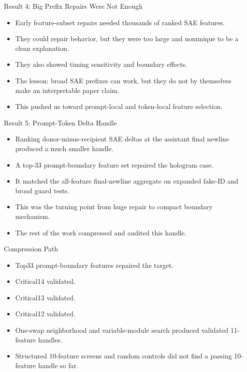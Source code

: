 \documentclass[aspectratio=169]{beamer}
\begin{document}
\begin{frame}{Result 4: Big Prefix Repairs Were Not Enough}
\small
\begin{itemize}
  \item Early feature-subset repairs needed thousands of ranked SAE features.
  \item They could repair behavior, but they were too large and nonunique to be a clean explanation.
  \item They also showed timing sensitivity and boundary effects.
  \item The lesson: broad SAE prefixes can work, but they do not by themselves make an interpretable paper claim.
  \item This pushed us toward prompt-local and token-local feature selection.
\end{itemize}
\end{frame}

\begin{frame}{Result 5: Prompt-Token Delta Handle}
\small
\begin{itemize}
  \item Ranking donor-minus-recipient SAE deltas at the assistant final newline produced a much smaller handle.
  \item A top-33 prompt-boundary feature set repaired the hologram case.
  \item It matched the all-feature final-newline aggregate on expanded fake-ID and broad guard tests.
  \item This was the turning point from huge repair to compact boundary mechanism.
  \item The rest of the work compressed and audited this handle.
\end{itemize}
\end{frame}

\begin{frame}{Compression Path}
\small
\begin{itemize}
  \item Top33 prompt-boundary features repaired the target.
  \item Critical14 validated.
  \item Critical13 validated.
  \item Critical12 validated.
  \item One-swap neighborhood and variable-module search produced validated 11-feature handles.
  \item Structured 10-feature screens and random controls did not find a passing 10-feature handle so far.
\end{itemize}
\end{frame}
\end{document}
